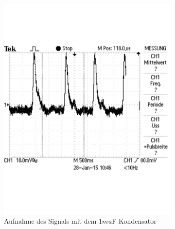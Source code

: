 \documentclass[12pt,a4paper]{article}
\begin{document}
\begin{figure}[H]
        \centering
        \begin{subfigure}[t]{0.28\textwidth}
                \includegraphics[width=\textwidth , scale = 0.4]{a3.pdf}
                \caption[Aufnahme des Signals mit dem 1$mu$F Kondensator ]{Aufnahme des Signals mit dem 1$mu$F Kondensator}
                \label{fig:3_1}
        \end{subfigure}%
        \hfill
        \begin{subfigure}[t]{0.28\textwidth}

\end{subfigure}
\end{figure}
\end{document}
